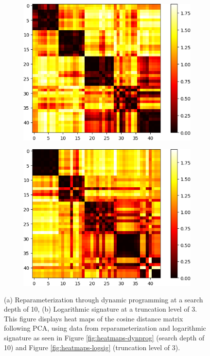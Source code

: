 \begin{figure}
    \begin{subfigure}[b]{0.48\textwidth}
        \centering
        \includegraphics[width=\textwidth]{figures/motion-capture-data/heatmaps/pca_10.png}
        \caption{}
    \end{subfigure}
    \hfill
    \begin{subfigure}[b]{0.48\textwidth}
        \centering
        \includegraphics[width=\textwidth]{figures/motion-capture-data/heatmaps/pca_3.png}
        \caption{}
    \end{subfigure}
    \caption[Heat Maps of Cosine Distances after PCA on Reparameterization and Logarithmic Signature Data]{(a) Reparameterization through dynamic programming at a search depth of 10, (b) Logarithmic signature at a truncation level of 3. This figure displays heat maps of the cosine distance matrix following PCA, using data from reparameterization and logarithmic signature as seen in Figure \ref{fig:heatmaps-dynprog} (search depth of 10) and Figure \ref{fig:heatmaps-logsig} (truncation level of 3).}
    \label{fig:heatmap-pca-cosine}
\end{figure}

